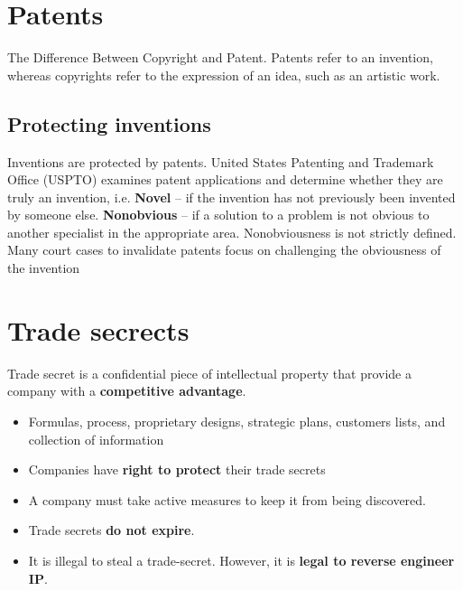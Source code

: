 \documentclass{article}
\begin{document}
\section{Patents}
\begin{flushleft}
The Difference Between Copyright and Patent. Patents refer to an invention, whereas copyrights refer to the expression of an idea, such as an artistic work. 
\end{flushleft}

\subsection{Protecting inventions}

\begin{flushleft}
Inventions are protected by patents. United States Patenting and Trademark Office (USPTO) examines patent applications and determine whether they are truly an invention, i.e. \textbf{Novel} – if the invention has not previously been invented by someone else. \textbf{Nonobvious} – if a solution to a problem is not obvious to another specialist in the appropriate area. Nonobviousness is not strictly defined. Many court cases to invalidate patents focus on challenging the obviousness of the invention
\end{flushleft}

\section{Trade secrects}
\begin{flushleft}
Trade secret is a confidential piece of intellectual property that provide a company with a \textbf{competitive advantage}.
\begin{itemize}
  \item Formulas, process, proprietary designs, strategic plans, customers lists, and collection of information
  \item Companies have \textbf{right to protect} their trade secrets 
  \item A company must take active measures to keep it from being discovered. 
  \item Trade secrets \textbf{do not expire}. 
  \item It is illegal to steal a trade-secret. However, it is \textbf{legal to reverse engineer IP}.
\end{itemize}
\end{flushleft}
\end{document}
